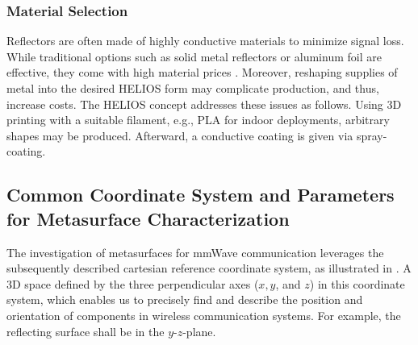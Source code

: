 \subsubsection{Material Selection}
Reflectors are often made of highly conductive materials to minimize signal loss. While traditional options such as solid metal reflectors or aluminum foil are effective, they come with high material prices \cite{Helios}. Moreover, reshaping supplies of metal into the desired HELIOS form may complicate production, and thus, increase costs. The HELIOS concept addresses these issues as follows. Using 3D printing with a suitable filament, e.g., PLA for indoor deployments, arbitrary shapes may be produced. Afterward, a conductive coating is given via spray-coating.
\subsection{Common Coordinate System and Parameters for Metasurface Characterization} \label{coordinate systems}
The investigation of metasurfaces for \ac{mmWave} communication leverages the subsequently described cartesian reference coordinate system, as illustrated in  . A 3D space defined by the three perpendicular axes ($x,y$, and $z$) in this coordinate system, which enables us to precisely find and describe the position and orientation of components in wireless communication systems. For example, the reflecting surface shall be in the $y$-$z$-plane.

